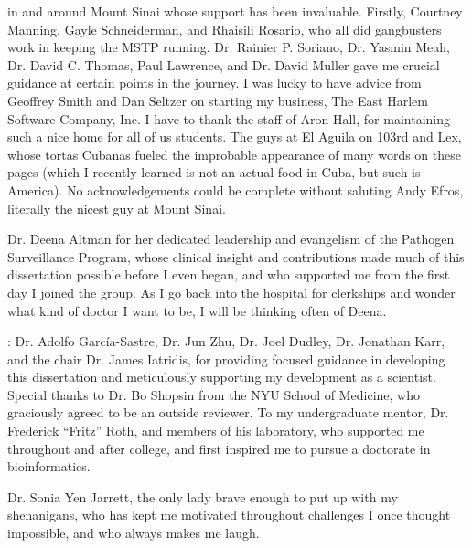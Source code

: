  in and around Mount Sinai whose support has been invaluable. Firstly, Courtney Manning, Gayle Schneiderman, and Rhaisili Rosario, who all did gangbusters work in keeping the MSTP running. Dr. Rainier P. Soriano, Dr. Yasmin Meah, Dr. David C. Thomas, Paul Lawrence, and Dr. David Muller gave me crucial guidance at certain points in the journey. I was lucky to have advice from Geoffrey Smith and Dan Seltzer on starting my business, The East Harlem Software Company, Inc. I have to thank the staff of Aron Hall, for maintaining such a nice home for all of us students. The guys at El Aguila on 103rd and Lex, whose tortas Cubanas fueled the improbable appearance of many words on these pages (which I recently learned is not an actual food in Cuba, but such is America). No acknowledgements could be complete without saluting Andy Efros, literally the nicest guy at Mount Sinai.

 Dr. Deena Altman for her dedicated leadership and evangelism of the Pathogen Surveillance Program, whose clinical insight and contributions made much of this dissertation possible before I even began, and who supported me from the first day I joined the group. As I go back into the hospital for clerkships and wonder what kind of doctor I want to be, I will be thinking often of Deena.

: Dr. Adolfo García-Sastre, Dr. Jun Zhu, Dr. Joel Dudley, Dr. Jonathan Karr, and the chair Dr. James Iatridis, for providing focused guidance in developing this dissertation and meticulously supporting my development as a scientist. Special thanks to Dr. Bo Shopsin from the NYU School of Medicine, who graciously agreed to be an outside reviewer. To my undergraduate mentor, Dr. Frederick ``Fritz'' Roth, and members of his laboratory, who supported me throughout and after college, and first inspired me to pursue a doctorate in bioinformatics.

 Dr. Sonia Yen Jarrett, the only lady brave enough to put up with my shenanigans, who has kept me motivated throughout challenges I once thought impossible, and who always makes me laugh.